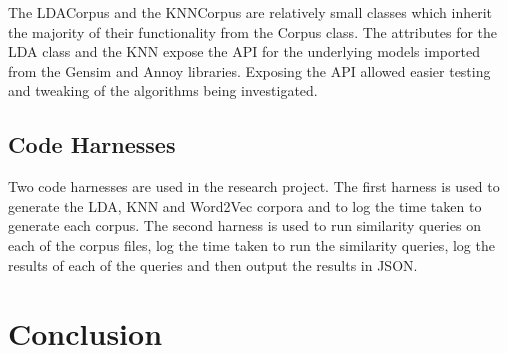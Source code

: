 The LDACorpus and the KNNCorpus are relatively small classes which inherit the majority of their functionality from the Corpus class.
The attributes for the LDA class and the KNN expose the API for the underlying models imported from the Gensim and Annoy libraries.
Exposing the API allowed easier testing and tweaking of the algorithms being investigated.

\subsection{Code Harnesses}
Two code harnesses are used in the research project. The first harness is used to generate the LDA, KNN and Word2Vec corpora and to log the time taken to generate each corpus.
The second harness is used to run similarity queries on each of the corpus files, log the time taken to run the similarity queries, log the results of each of the queries and then output the results in JSON.

\section{Conclusion}
